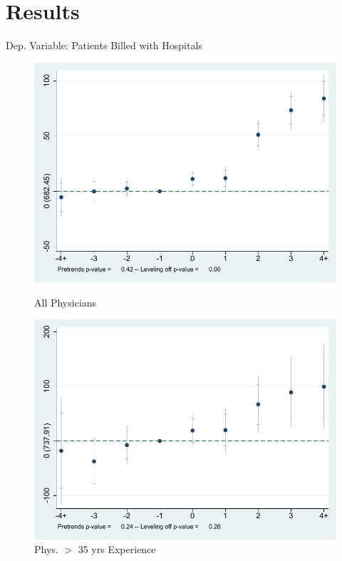 \documentclass[10pt]{beamer}
\begin{document}
\section{Results}

\begin{frame}{Dep. Variable: Patients Billed with Hospitals}
\begin{figure}[ht]
        \begin{minipage}[b]{0.47\linewidth}
            \centering
            \includegraphics[width=\textwidth]{Objects/xtevent_fullsample.pdf}
            \caption{\small All Physicians\\}
        \end{minipage}
        \hspace{0.2cm}
        \begin{minipage}[b]{0.47\linewidth}
            \centering
            \includegraphics[width=\textwidth]{Objects/xtevent_oldsample.pdf}
            \caption{\small Phys. $>$ 35 yrs Experience}
        \end{minipage}
    \end{figure}
\end{frame}
\end{document}
